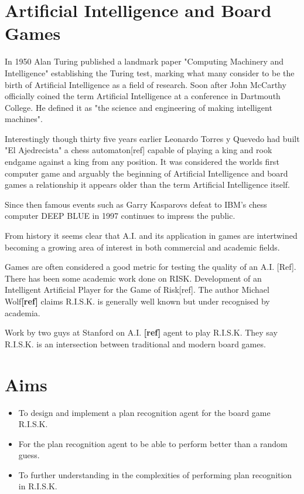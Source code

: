 \documentclass[parskip]{cs4rep}
\begin{document}
\section{Artificial Intelligence and Board Games}

In 1950 Alan Turing published a landmark paper "Computing Machinery and Intelligence" establishing the Turing test, marking what many consider to be the birth of Artificial Intelligence as a field of research. Soon after John McCarthy officially coined the term Artificial Intelligence at a conference in Dartmouth College. He defined it as "the science and engineering of making intelligent machines".

Interestingly though thirty five years earlier Leonardo Torres y Quevedo had built "El Ajedrecista" a chess automaton[ref] capable of playing a king and rook endgame against a king from any position. It was considered the worlds first computer game and arguably the beginning of Artificial Intelligence and board games a relationship it appears older than the term Artificial Intelligence itself. 

Since then famous events such as Garry Kasparovs defeat to IBM's chess computer DEEP BLUE in 1997 continues to impress the public. 

From history it seems clear that A.I. and its application in games are intertwined becoming a growing area of interest in both commercial and academic fields.

Games are often considered a good metric for testing the quality of an A.I. [Ref]. There has been some academic work done on RISK. Development of an Intelligent Artificial Player for the Game of Risk[ref]. The author Michael Wolf\textbf{[ref]} claims R.I.S.K. is generally well known but under recognised by academia.

Work by two guys at Stanford on A.I. \textbf{[ref]} agent to play R.I.S.K. They say R.I.S.K. is an intersection between traditional and modern board games.

\section{Aims}

\begin{itemize}
\item
To design and implement a plan recognition agent for the board game R.I.S.K.
\item
For the plan recognition agent to be able to perform better than a random guess.
\item
To further understanding in the complexities of performing plan recognition in R.I.S.K.
\end{itemize}
\end{document}
